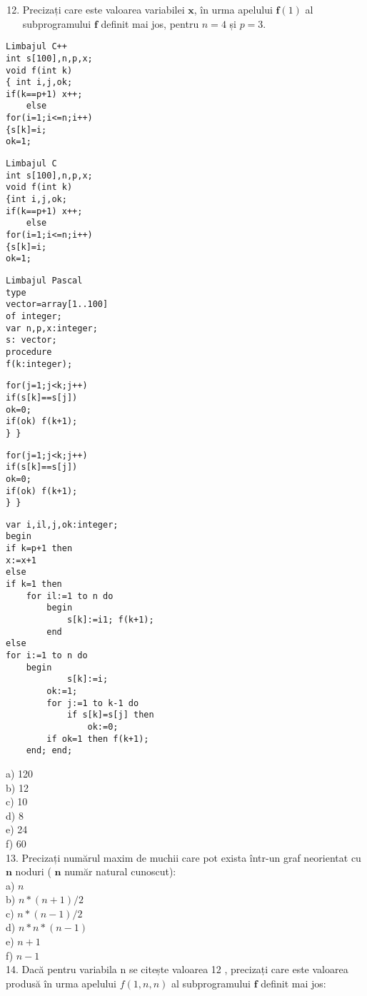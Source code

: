 \begin{enumerate}
  \setcounter{enumi}{11}
  \item Precizați care este valoarea variabilei $\mathbf{x}$, în urma apelului $\mathbf{f}(1)$ al subprogramului $\mathbf{f}$ definit mai jos, pentru $n=4$ și $p=3$.
\end{enumerate}

\begin{verbatim}
Limbajul C++
int s[100],n,p,x;
void f(int k)
{ int i,j,ok;
if(k==p+1) x++;
    else
for(i=1;i<=n;i++)
{s[k]=i;
ok=1;
\end{verbatim}

\begin{verbatim}
Limbajul C
int s[100],n,p,x;
void f(int k)
{int i,j,ok;
if(k==p+1) x++;
    else
for(i=1;i<=n;i++)
{s[k]=i;
ok=1;
\end{verbatim}

\begin{verbatim}
Limbajul Pascal
type
vector=array[1..100]
of integer;
var n,p,x:integer;
s: vector;
procedure
f(k:integer);
\end{verbatim}

\begin{verbatim}
for(j=1;j<k;j++)
if(s[k]==s[j])
ok=0;
if(ok) f(k+1);
} }
\end{verbatim}

\begin{verbatim}
for(j=1;j<k;j++)
if(s[k]==s[j])
ok=0;
if(ok) f(k+1);
} }
\end{verbatim}

\begin{verbatim}
var i,il,j,ok:integer;
begin
if k=p+1 then
x:=x+1
else
if k=1 then
    for il:=1 to n do
        begin
            s[k]:=i1; f(k+1);
        end
else
for i:=1 to n do
    begin
            s[k]:=i;
        ok:=1;
        for j:=1 to k-1 do
            if s[k]=s[j] then
                ok:=0;
        if ok=1 then f(k+1);
    end; end;
\end{verbatim}

a) 120\\
b) 12\\
c) 10\\
d) 8\\
e) 24\\
f) 60\\
13. Precizați numărul maxim de muchii care pot exista într-un graf neorientat cu $\mathbf{n}$ noduri ( $\mathbf{n}$ număr natural cunoscut):\\
a) $n$\\
b) $n *(n+1) / 2$\\
c) $n *(n-1) / 2$\\
d) $n * n *(n-1)$\\
e) $n+1$\\
f) $n-1$\\
14. Dacă pentru variabila n se citește valoarea 12 , precizați care este valoarea produsă în urma apelului $f(1, n, n)$ al subprogramului $\mathbf{f}$ definit mai jos:

